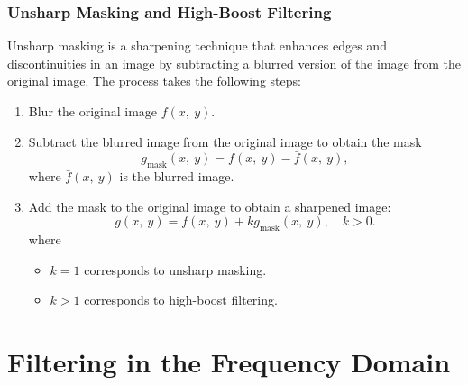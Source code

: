 \documentclass{article}
\begin{document}
\subsubsection{Unsharp Masking and High-Boost Filtering}
Unsharp masking is a sharpening technique that enhances edges and
discontinuities in an image by subtracting a blurred version of the
image from the original image. The process takes the following steps:
\begin{enumerate}
    \item Blur the original image \(f\left( x,\: y \right)\).
    \item Subtract the blurred image from the original image to obtain
          the mask
          \begin{equation*}
              g_{\text{mask}}\left( x,\: y \right) = f\left( x,\: y \right) - \bar{f}\left( x,\: y \right),
          \end{equation*}
          where \(\bar{f}\left( x,\: y \right)\) is the blurred image.
    \item Add the mask to the original image to obtain a sharpened
          image:
          \begin{equation*}
              g\left( x,\: y \right) = f\left( x,\: y \right) + k g_{\text{mask}}\left( x,\: y \right), \quad k > 0.
          \end{equation*}
          where
          \begin{itemize}
              \item \(k = 1\) corresponds to unsharp masking.
              \item \(k > 1\) corresponds to high-boost filtering.
          \end{itemize}
\end{enumerate}
\section{Filtering in the Frequency Domain}
\end{document}
